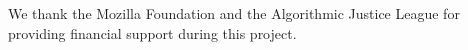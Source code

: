 \documentclass[acmconf,manuscript,screen,natbib=true]{acmart}
\begin{document}







\begin{acks}
We thank the Mozilla Foundation and the Algorithmic Justice League for providing financial support during this project. 

\end{acks}




\end{document}
